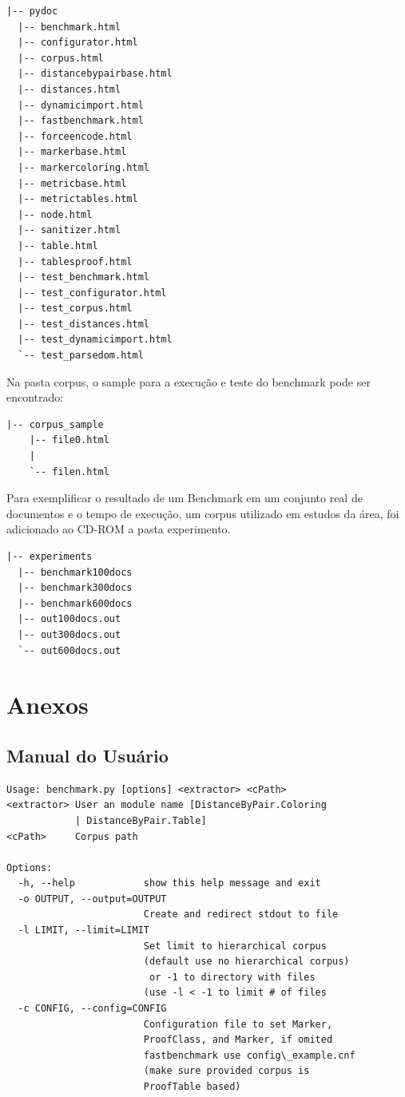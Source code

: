\documentclass[12pt, a4paper]{article}
\begin{document}
\begin{verbatim}
|-- pydoc
  |-- benchmark.html
  |-- configurator.html
  |-- corpus.html
  |-- distancebypairbase.html
  |-- distances.html
  |-- dynamicimport.html
  |-- fastbenchmark.html
  |-- forceencode.html
  |-- markerbase.html
  |-- markercoloring.html
  |-- metricbase.html
  |-- metrictables.html
  |-- node.html
  |-- sanitizer.html
  |-- table.html
  |-- tablesproof.html
  |-- test_benchmark.html
  |-- test_configurator.html
  |-- test_corpus.html
  |-- test_distances.html
  |-- test_dynamicimport.html
  `-- test_parsedom.html

\end{verbatim}

Na pasta corpus, o sample para a execução e teste do benchmark pode ser
encontrado:

\begin{verbatim}
|-- corpus_sample
    |-- file0.html 
    |
    `-- filen.html
\end{verbatim}

Para exemplificar o resultado de um Benchmark em um conjunto real de
documentos e o tempo de execução, um corpus utilizado em estudos da área,
foi adicionado ao CD-ROM a pasta experimento.

\begin{verbatim}
|-- experiments
  |-- benchmark100docs
  |-- benchmark300docs
  |-- benchmark600docs
  |-- out100docs.out
  |-- out300docs.out
  `-- out600docs.out
\end{verbatim}

\appendix

\section{Anexos}
\subsection{Manual do Usuário}
\label{userdoc}

\begin{verbatim}
Usage: benchmark.py [options] <extractor> <cPath>
<extractor> User an module name [DistanceByPair.Coloring
            | DistanceByPair.Table]
<cPath>     Corpus path 

Options:
  -h, --help            show this help message and exit
  -o OUTPUT, --output=OUTPUT
                        Create and redirect stdout to file
  -l LIMIT, --limit=LIMIT
                        Set limit to hierarchical corpus 
                        (default use no hierarchical corpus)
                         or -1 to directory with files
                        (use -l < -1 to limit # of files
  -c CONFIG, --config=CONFIG
                        Configuration file to set Marker, 
                        ProofClass, and Marker, if omited
                        fastbenchmark use config\_example.cnf
                        (make sure provided corpus is
                        ProofTable based)

\end{verbatim}
\end{document}
